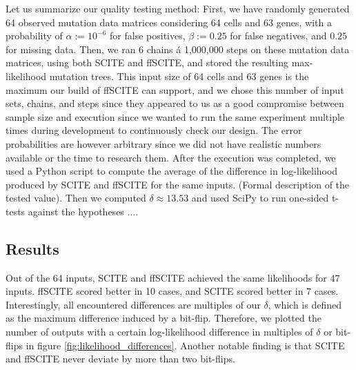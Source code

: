 Let us summarize our quality testing method: First, we have randomly generated 64 observed mutation data matrices considering 64 cells and 63 genes, with a probability of $\alpha := 10^{-6}$ for false positives, $\beta := 0.25$ for false negatives, and $0.25$ for missing data. Then, we ran 6 chains á 1,000,000 steps on these mutation data matrices, using both \ac{SCITE} and \ac{ffSCITE}, and stored the resulting max-likelihood mutation trees. This input size of 64 cells and 63 genes is the maximum our build of \ac{ffSCITE} can support, and we chose this number of input sets, chains, and steps since they appeared to us as a good compromise between sample size and execution since we wanted to run the same experiment multiple times during development to continuously check our design. The error probabilities are however arbitrary since we did not have realistic numbers available or the time to research them. After the execution was completed, we used a Python script to compute the average of the difference in log-likelihood produced by \ac{SCITE} and \ac{ffSCITE} for the same inputs. (Formal description of the tested value). Then we computed $\delta \approx 13.53$ and used SciPy to run one-sided t-tests against the hypotheses $\dots$.


\subsection{Results}

Out of the 64 inputs, \ac{SCITE} and \ac{ffSCITE} achieved the same likelihoods for 47 inputs. \ac{ffSCITE} scored better in 10 cases, and \ac{SCITE} scored better in 7 cases. Interestingly, all encountered differences are multiples of our $\delta$, which is defined as the maximum difference induced by a bit-flip. Therefore, we plotted the number of outputs with a certain log-likelihood difference in multiples of $\delta$ or bit-flips in figure \ref{fig:likelihood_differences}. Another notable finding is that \ac{SCITE} and \ac{ffSCITE} never deviate by more than two bit-flips.

